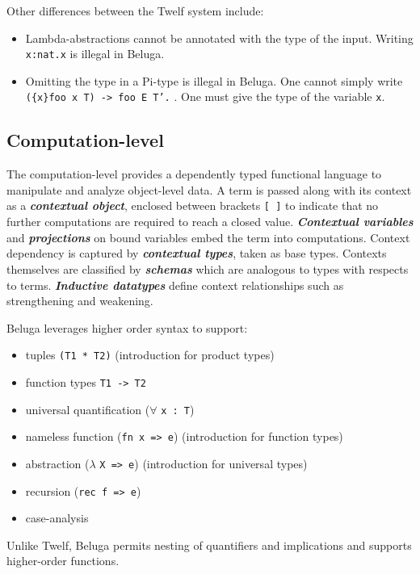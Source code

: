 \documentclass[11pt]{article}
\begin{document}
Other differences between the Twelf system include:
\begin{itemize}
\item Lambda-abstractions cannot be annotated with the type of the input. Writing \texttt{\\x:nat.x} is illegal in Beluga.
\item Omitting the type in a Pi-type is illegal in Beluga. One cannot simply write \texttt{(\{x\}foo x T) -> foo E T'.} . One must give the type of the variable \texttt{x}.
\end{itemize}



\subsection{Computation-level}
The computation-level provides a dependently typed functional language to manipulate and analyze object-level data. A term is passed along with its context as a \textbf{\textit{contextual object}}, enclosed between brackets \texttt{[ ]} to indicate that no further computations are required to reach a closed value. \textbf{\textit{Contextual variables}} and \textbf{\textit{projections}} on bound variables embed the term into computations. Context dependency is captured by \textit{\textbf{contextual types}}, taken as base types. Contexts themselves are classified by \textit{\textbf{schemas}} which are analogous to types with respects to terms. \textit{\textbf{Inductive datatypes}} define context relationships such as strengthening and weakening.

Beluga leverages higher order syntax to support: 
\begin{itemize}
\item tuples \texttt{(T1 * T2)} (introduction for product types)
\item function types \texttt{T1 -> T2}
\item universal quantification ($\forall$ \texttt{x : T})
\item nameless function (\texttt{fn x => e}) (introduction for function types)
\item abstraction ($\lambda$ \texttt{X => e}) (introduction for universal types)
\item recursion (\texttt{rec f => e})
\item case-analysis 
\end{itemize}
Unlike Twelf, Beluga permits nesting of quantifiers and implications and supports higher-order functions. 
\end{document}
